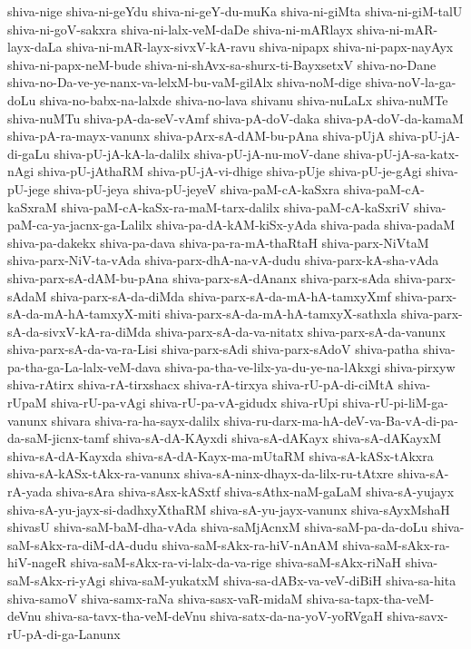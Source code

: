 {shiva-nige
shiva-ni-geYdu
shiva-ni-geY-du-muKa
shiva-ni-giMta
shiva-ni-giM-talU
shiva-ni-goV-sakxra
shiva-ni-lalx-veM-daDe
shiva-ni-mARlayx
shiva-ni-mAR-layx-daLa
shiva-ni-mAR-layx-sivxV-kA-ravu
shiva-nipapx
shiva-ni-papx-nayAyx
shiva-ni-papx-neM-bude
shiva-ni-shAvx-sa-shurx-ti-BayxsetxV
shiva-no-Dane
shiva-no-Da-ve-ye-nanx-va-lelxM-bu-vaM-gilAlx
shiva-noM-dige
shiva-noV-la-ga-doLu
shiva-no-babx-na-lalxde
shiva-no-lava
shivanu
shiva-nuLaLx
shiva-nuMTe
shiva-nuMTu
shiva-pA-da-seV-vAmf
shiva-pA-doV-daka
shiva-pA-doV-da-kamaM
shiva-pA-ra-mayx-vanunx
shiva-pArx-sA-dAM-bu-pAna
shiva-pUjA
shiva-pU-jA-di-gaLu
shiva-pU-jA-kA-la-dalilx
shiva-pU-jA-nu-moV-dane
shiva-pU-jA-sa-katx-nAgi
shiva-pU-jAthaRM
shiva-pU-jA-vi-dhige
shiva-pUje
shiva-pU-je-gAgi
shiva-pU-jege
shiva-pU-jeya
shiva-pU-jeyeV
shiva-paM-cA-kaSxra
shiva-paM-cA-kaSxraM
shiva-paM-cA-kaSx-ra-maM-tarx-dalilx
shiva-paM-cA-kaSxriV
shiva-paM-ca-ya-jacnx-ga-Lalilx
shiva-pa-dA-kAM-kiSx-yAda
shiva-pada
shiva-padaM
shiva-pa-dakekx
shiva-pa-dava
shiva-pa-ra-mA-thaRtaH
shiva-parx-NiVtaM
shiva-parx-NiV-ta-vAda
shiva-parx-dhA-na-vA-dudu
shiva-parx-kA-sha-vAda
shiva-parx-sA-dAM-bu-pAna
shiva-parx-sA-dAnanx
shiva-parx-sAda
shiva-parx-sAdaM
shiva-parx-sA-da-diMda
shiva-parx-sA-da-mA-hA-tamxyXmf
shiva-parx-sA-da-mA-hA-tamxyX-miti
shiva-parx-sA-da-mA-hA-tamxyX-sathxla
shiva-parx-sA-da-sivxV-kA-ra-diMda
shiva-parx-sA-da-va-nitatx
shiva-parx-sA-da-vanunx
shiva-parx-sA-da-va-ra-Lisi
shiva-parx-sAdi
shiva-parx-sAdoV
shiva-patha
shiva-pa-tha-ga-La-lalx-veM-dava
shiva-pa-tha-ve-lilx-ya-du-ye-na-lAkxgi
shiva-pirxyw
shiva-rAtirx
shiva-rA-tirxshacx
shiva-rA-tirxya
shiva-rU-pA-di-ciMtA
shiva-rUpaM
shiva-rU-pa-vAgi
shiva-rU-pa-vA-gidudx
shiva-rUpi
shiva-rU-pi-liM-ga-vanunx
shivara
shiva-ra-ha-sayx-dalilx
shiva-ru-darx-ma-hA-deV-va-Ba-vA-di-pa-da-saM-jicnx-tamf
shiva-sA-dA-KAyxdi
shiva-sA-dAKayx
shiva-sA-dAKayxM
shiva-sA-dA-Kayxda
shiva-sA-dA-Kayx-ma-mUtaRM
shiva-sA-kASx-tAkxra
shiva-sA-kASx-tAkx-ra-vanunx
shiva-sA-ninx-dhayx-da-lilx-ru-tAtxre
shiva-sA-rA-yada
shiva-sAra
shiva-sAsx-kASxtf
shiva-sAthx-naM-gaLaM
shiva-sA-yujayx
shiva-sA-yu-jayx-si-dadhxyXthaRM
shiva-sA-yu-jayx-vanunx
shiva-sAyxMshaH
shivasU
shiva-saM-baM-dha-vAda
shiva-saMjAcnxM
shiva-saM-pa-da-doLu
shiva-saM-sAkx-ra-diM-dA-dudu
shiva-saM-sAkx-ra-hiV-nAnAM
shiva-saM-sAkx-ra-hiV-nageR
shiva-saM-sAkx-ra-vi-lalx-da-va-rige
shiva-saM-sAkx-riNaH
shiva-saM-sAkx-ri-yAgi
shiva-saM-yukatxM
shiva-sa-dABx-va-veV-diBiH
shiva-sa-hita
shiva-samoV
shiva-samx-raNa
shiva-sasx-vaR-midaM
shiva-sa-tapx-tha-veM-deVnu
shiva-sa-tavx-tha-veM-deVnu
shiva-satx-da-na-yoV-yoRVgaH
shiva-savx-rU-pA-di-ga-Lanunx
}

